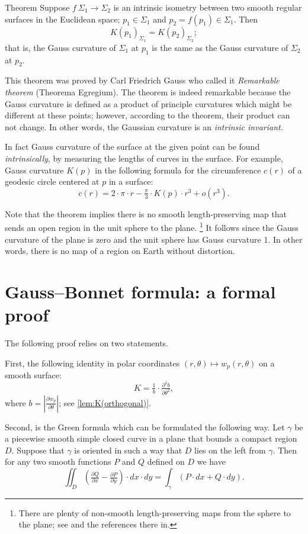 \begin{thm}{Theorem}\label{thm:remarkable}
Suppose $f\:\Sigma_1\to \Sigma_2$ is an intrinsic isometry between two smooth regular surfaces in  the Euclidean space; $p_1\in \Sigma_1$ and $p_2=f(p_1)\in \Sigma_1$.
Then 
\[K(p_1)_{\Sigma_1}=K(p_2)_{\Sigma_2};\]
that is, the Gauss curvature of $\Sigma_1$ at $p_1$ is the same as the Gauss curvature of $\Sigma_2$ at $p_2$.
\end{thm}

This theorem was proved by Carl Friedrich Gauss \cite{gauss} who called it \emph{Remarkable theorem} (Theorema Egregium).
The theorem is indeed remarkable because the Gauss curvature is defined as a product of principle curvatures which might be different at these points; however, according to the theorem, their product can not change.
In other words, the Gaussian curvature is an \emph{intrinsic invariant}.

In fact Gauss curvature of the surface at the given point can be found \emph{intrinsically},
by measuring the lengths of curves in the surface.
For example, Gauss curvature $K(p)$ in the following formula for the circumference $c(r)$ of a geodesic circle centered at $p$ in a surface: 
\[c(r)=2\cdot\pi\cdot r-\tfrac\pi3\cdot K(p)\cdot r^3+o(r^3).\]

Note that the theorem implies there is no smooth length-preserving map that sends an open region in the unit sphere to the plane.%
\footnote{There are plenty of non-smooth length-preserving maps from the sphere to the plane; see \cite{petrunin-yashinski} and the references there in.}
It follows since the Gauss curvature of the plane is zero and the unit sphere has Gauss curvature 1. 
In other words, there is no map of a region on Earth without distortion.


\section*{Gauss--Bonnet formula: a formal proof}\label{page:gauss--bonnet:formal}

The following proof relies on two statements.

First, the following identity in polar coordinates $(r,\theta)\mapsto w_p(r,\theta)$ on a smooth surface:
\[K=\tfrac1b\cdot\tfrac{\partial^2 b}{\partial \theta^2},\]
where $b=|\tfrac{\partial w_p}{\partial \theta}|$; see \ref{lem:K(orthogonal)}.

Second, is the Green formula which can be formulated the following way.
Let $\gamma$ be a piecewise smooth simple closed curve in a plane that bounds a compact region $D$.
Suppose that $\gamma$ is oriented in such a way that $D$ lies on the left from $\gamma$.
Then for any two smooth functions $P$ and $Q$ defined on $D$ we have
\[\iint_D (\tfrac{\partial Q}{\partial x}-\tfrac{\partial P}{\partial y})\cdot dx\cdot dy=\int_\gamma (P\cdot dx+Q\cdot dy).\]


